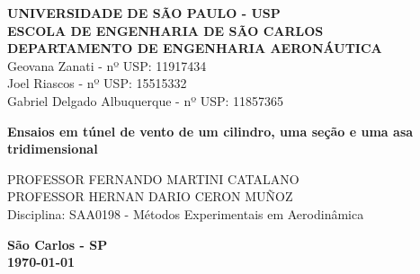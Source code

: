 \begin{titlepage}
\begin{center}
\textbf{UNIVERSIDADE DE SÃO PAULO - USP\\
ESCOLA DE ENGENHARIA DE SÃO CARLOS\\
DEPARTAMENTO DE ENGENHARIA AERONÁUTICA}\\[2cm]

\large Geovana Zanati - nº USP: 11917434\\
\large Joel Riascos - nº USP: 15515332\\
\large Gabriel Delgado Albuquerque - nº USP: 11857365\\

\hfill\break
\hfill\break
\hfill\break
\hfill\break
\hfill\break

\huge{\textbf{Ensaios em túnel de vento de um cilindro, uma seção e uma asa tridimensional}}\\
\vspace{5cm}

\normalsize{PROFESSOR \MakeUppercase{Fernando Martini Catalano}}\\
\normalsize{PROFESSOR \MakeUppercase{Hernan Dario Ceron Muñoz}}\\
\normalsize{Disciplina: SAA0198 - Métodos Experimentais em Aerodinâmica}

\vfill
\large \textbf{São Carlos - SP}\\
\large \textbf{\today}\\
\end{center}
\end{titlepage}

\tableofcontents
\clearpage
\listoffigures
\listoftables